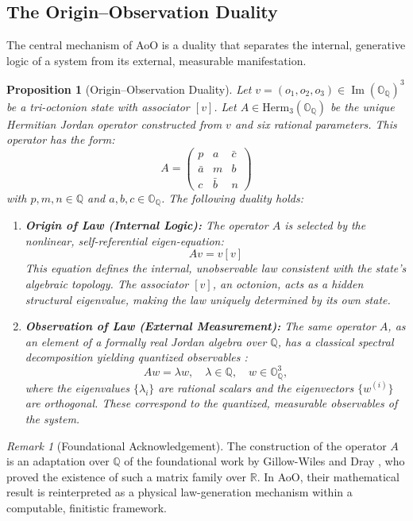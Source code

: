 \documentclass[11pt, a4paper]{article}
\newtheorem{proposition}[theorem]{Proposition}
\theoremstyle{definition}
\theoremstyle{remark}
\newtheorem{remark}[theorem]{Remark}
\newcommand{\Q}{\mathbb{Q}}
\newcommand{\OQ}{\mathbb{O}_{\mathbb{Q}}}
\begin{document}
\subsection{The Origin–Observation Duality}
The central mechanism of AoO is a duality that separates the internal, generative logic of a system from its external, measurable manifestation.

\begin{proposition}[Origin–Observation Duality]
\textit{Let $v = (o_1, o_2, o_3) \in \operatorname{Im}(\OQ)^3$ be a tri-octonion state with associator $[v]$. Let $A \in \mathrm{Herm}_3(\OQ)$ be the unique Hermitian Jordan operator constructed from $v$ and six rational parameters. This operator has the form:}
\[ A = \begin{pmatrix} p & a & \bar{c} \\ \bar{a} & m & b \\ c & \bar{b} & n \end{pmatrix} \]
\textit{with $p,m,n \in \Q$ and $a,b,c \in \OQ$. The following duality holds:}
\begin{enumerate}
    \item \textbf{Origin of Law (Internal Logic):} The operator $A$ is selected by the nonlinear, self-referential eigen-equation:
    \[ A v = v [v] \]
    \textit{This equation defines the internal, unobservable law consistent with the state's algebraic topology. The associator $[v]$, an octonion, acts as a hidden structural eigenvalue, making the law uniquely determined by its own state.}

    \item \textbf{Observation of Law (External Measurement):} The same operator $A$, as an element of a formally real Jordan algebra over $\Q$, has a classical spectral decomposition yielding quantized observables \cite{EK2025d}:
    \[ A w = \lambda w, \quad \lambda \in \Q, \quad w \in \OQ^3, \]
    \textit{where the eigenvalues $\{\lambda_i\}$ are rational scalars and the eigenvectors $\{w^{(i)}\}$ are orthogonal. These correspond to the quantized, measurable observables of the system.}
\end{enumerate}
\end{proposition}
\begin{remark}[Foundational Acknowledgement]
The construction of the operator $A$ is an adaptation over $\Q$ of the foundational work by Gillow-Wiles and Dray \cite{GillowDray2009}, who proved the existence of such a matrix family over $\mathbb{R}$. In AoO, their mathematical result is reinterpreted as a physical law-generation mechanism within a computable, finitistic framework.
\end{remark}
\end{document}
